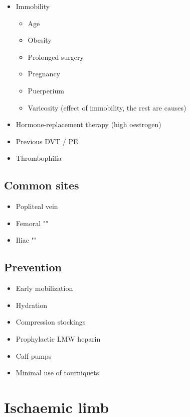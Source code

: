 \documentclass[
  12pt,
]{memoir}
\providecommand{\tightlist}{%
  \setlength{\itemsep}{0pt}\setlength{\parskip}{0pt}}
\begin{document}
\begin{itemize}
\tightlist
\item
  Immobility

  \begin{itemize}
  \tightlist
  \item
    Age
  \item
    Obesity
  \item
    Prolonged surgery
  \item
    Pregnancy
  \item
    Puerperium
  \item
    Varicosity (effect of immobility, the rest are causes)
  \end{itemize}
\item
  Hormone-replacement therapy (high oestrogen)
\item
  Previous DVT / PE
\item
  Thrombophilia
\end{itemize}

\hypertarget{common-sites}{%
\subsection{Common sites}\label{common-sites}}

\begin{itemize}
\tightlist
\item
  Popliteal vein
\item
  Femoral ""
\item
  Iliac ""
\end{itemize}

\hypertarget{prevention}{%
\subsection{Prevention}\label{prevention}}

\begin{itemize}
\tightlist
\item
  Early mobilization
\item
  Hydration
\item
  Compression stockings
\item
  Prophylactic LMW heparin
\item
  Calf pumps
\item
  Minimal use of tourniquets
\end{itemize}

\hypertarget{ischaemic-limb}{%
\section{Ischaemic limb}\label{ischaemic-limb}}
\end{document}

